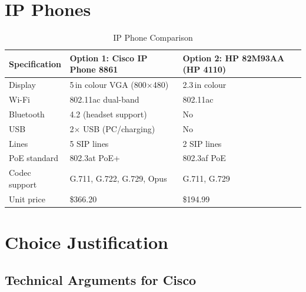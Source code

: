 \documentclass[12pt,a4paper]{report}
\begin{document}
\section{IP Phones}

\begin{table}[H]
  \centering
  \caption{IP Phone Comparison}
  \label{tab:phone_compare}
  \begin{tabular}{L{3.8cm} L{5.2cm} L{5.2cm}}
    \toprule
    \textbf{Specification} & \textbf{Option 1: Cisco IP Phone 8861} & \textbf{Option 2: HP 82M93AA (HP 4110)} \\
    \midrule
    Display                & 5\,in colour VGA (800$\times$480) & 2.3\,in colour \\
    Wi-Fi                  & 802.11ac dual-band                & 802.11ac \\
    Bluetooth              & 4.2 (headset support)             & No \\
    USB                    & 2$\times$ USB (PC/charging)       & No \\
    Lines                  & 5 SIP lines                       & 2 SIP lines \\
    PoE standard           & 802.3at PoE+                      & 802.3af PoE \\
    Codec support          & G.711, G.722, G.729, Opus         & G.711, G.729 \\
    Unit price       & \$366.20                          & \$194.99 \\
    \bottomrule
  \end{tabular}
\end{table}

\section{Choice Justification}
\label{sec:equip_justification}

\subsection*{Technical Arguments for Cisco}
\end{document}
